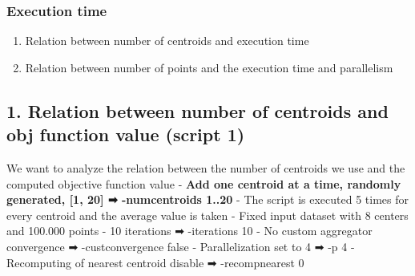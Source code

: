\documentclass[11pt]{article}
\providecommand{\tightlist}{%
      \setlength{\itemsep}{0pt}\setlength{\parskip}{0pt}}
\begin{document}
\hypertarget{execution-time}{%
\subsubsection{Execution time}\label{execution-time}}

\begin{enumerate}
\def\labelenumi{\arabic{enumi}.}
\setcounter{enumi}{3}
\tightlist
\item
  Relation between number of centroids and execution time
\item
  Relation between number of points and the execution time and
  parallelism
\end{enumerate}

    \hypertarget{relation-between-number-of-centroids-and-obj-function-value-script-1}{%
\subsection{1. Relation between number of centroids and obj function
value (script
1)}\label{relation-between-number-of-centroids-and-obj-function-value-script-1}}

We want to analyze the relation between the number of centroids we use
and the computed objective function value - \textbf{Add one centroid at
a time, randomly generated, {[}1, 20{]} ➡ -numcentroids 1..20} - The
script is executed 5 times for every centroid and the average value is
taken - Fixed input dataset with 8 centers and 100.000 points - 10
iterations ➡ -iterations 10 - No custom aggregator convergence ➡
-custconvergence false - Parallelization set to 4 ➡ -p 4 - Recomputing
of nearest centroid disable ➡ -recompnearest 0
\end{document}
